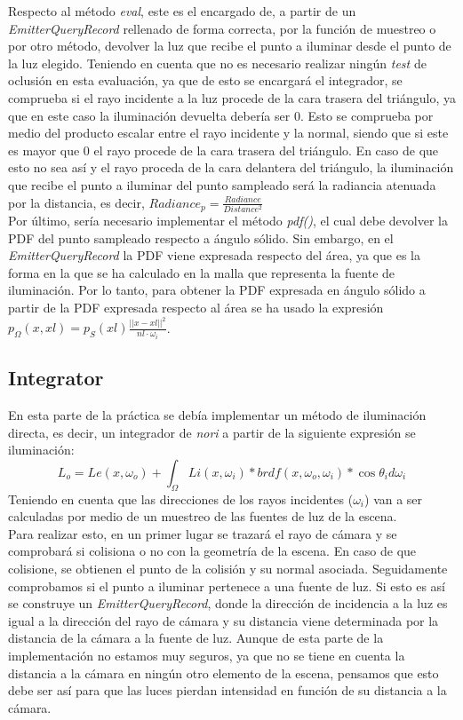 \documentclass[10pt,oneside,a4paper]{article}
\begin{document}
Respecto al método \textit{eval}, este es el encargado de, a partir de un \textit{EmitterQueryRecord} rellenado de forma correcta, por la función de muestreo o por otro método, devolver la luz que recibe el punto a iluminar desde el punto de la luz elegido. Teniendo en cuenta que no es necesario realizar ningún \textit{test} de oclusión en esta evaluación, ya que de esto se encargará el integrador, se comprueba si el rayo incidente a la luz procede de la cara trasera del triángulo, ya que en este caso la iluminación devuelta debería ser 0. Esto se comprueba por medio del producto escalar entre el rayo incidente y la normal, siendo que si este es mayor que 0 el rayo procede de la cara trasera del triángulo. En caso de que esto no sea así y el rayo proceda de la cara delantera del triángulo, la iluminación que recibe el punto a iluminar del punto sampleado será la radiancia atenuada por la distancia, es decir, $Radiance_p = \frac{Radiance}{Distance^2}$\\

Por último, sería necesario implementar el método \textit{pdf()}, el cual debe devolver la PDF del punto sampleado respecto a ángulo sólido. Sin embargo, en el \textit{EmitterQueryRecord} la PDF viene expresada respecto del área, ya que es la forma en la que se ha calculado en la malla que representa la fuente de iluminación. Por lo tanto, para obtener la PDF expresada en ángulo sólido a partir de la PDF expresada respecto al área se ha usado la expresión $p_\Omega(x,xl) = p_S(xl)\frac{||x-xl||^2}{nl\cdot\omega_i}$.\\

\subsection{Integrator}
En esta parte de la práctica se debía implementar un método de iluminación directa, es decir, un integrador de \textit{nori} a partir de la siguiente expresión se iluminación:
$$L_o = Le(x,\omega_o) + \int_\Omega Li(x,\omega_i) * brdf(x,\omega_o,\omega_i)  * \cos\theta_i d\omega_i$$
Teniendo en cuenta que las direcciones de los rayos incidentes ($\omega_i$) van a ser calculadas por medio de un muestreo de las fuentes de luz de la escena.\\

Para realizar esto, en un primer lugar se trazará el rayo de cámara y se comprobará si colisiona o no con la geometría de la escena. En caso de que colisione, se obtienen el punto de la colisión y su normal asociada. Seguidamente comprobamos si el punto a iluminar pertenece a una fuente de luz. Si esto es así se construye un \textit{EmitterQueryRecord}, donde la dirección de incidencia a la luz es igual a la dirección del rayo de cámara y su distancia viene determinada por la distancia de la cámara a la fuente de luz. Aunque de esta parte de la implementación no estamos muy seguros, ya que no se tiene en cuenta la distancia a la cámara en ningún otro elemento de la escena, pensamos que esto debe ser así para que las luces pierdan intensidad en función de su distancia a la cámara.\\
\end{document}
